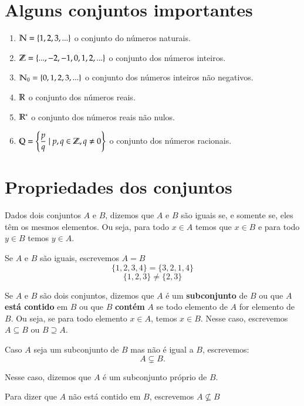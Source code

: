 \section{Alguns conjuntos importantes}
\begin{enumerate}
\item $\mathbb{N} = \{1,2,3,...\}$ o conjunto do n{\'u}meros naturais.
\item $\mathbb{Z} = \{...,-2,-1,0,1,2,...\}$ o conjunto dos n{\'u}meros inteiros.
\item $\mathbb{N}_0 = \{0,1,2,3,...\}$ o conjunto dos n{\'u}meros inteiros n{\~a}o negativos.
\item $\mathbb{R} $ o conjunto dos n{\'u}meros reais.
\item $\mathbb{R}^*$ o conjunto dos n{\'u}meros reais n{\~a}o nulos.
\item $\mathbb{Q} = \left\{\dfrac{p}{q} \mid p,q \in \mathbb{Z}, q \neq 0 \right\}$ o conjunto dos n{\'u}meros racionais.
\end{enumerate}

\section{Propriedades dos conjuntos}

\begin{definicao}
	Dados dois conjuntos $A$ e $B$, dizemos que $A$ e $B$ s{\~a}o iguais se, e somente se, eles t{\^e}m os mesmos elementos. Ou seja, para todo $x \in A$ temos que $x \in B$ e para todo $y \in B$ temos $y \in A$.
\end{definicao}

Se $A$ e $B$ s{\~a}o iguais, escrevemos $A = B$
\[ \{1,2,3,4\} = \{3,2,1,4\} \]
\[ \{1,2,3\} \neq \{2,3\} \]

\begin{definicao}
	Se $A$ e $B$ s{\~a}o dois conjuntos, dizemos que $A$ {\'e} um \textbf{subconjunto} de $B$ ou que $A$ \textbf{está contido} em $B$ ou que $B$ \textbf{contém} $A$ se todo elemento de $A$ for elemento de $B$. Ou seja, se para todo elemento $x \in A$, temos $x \in B$. Nesse caso, escrevemos $A \subseteq B$ ou $B \supseteq A$.
\end{definicao}


Caso $A$ seja um subconjunto de $B$ mas n{\~a}o {\'e} igual a $B$, escrevemos:
\[
A \subsetneq B.
\]

Nesse caso, dizemos que $A$ {\'e} um subconjunto pr{\'o}prio de $B$.

Para dizer que $A$ n{\~a}o est{\'a} contido em $B$, escrevemos $A \nsubseteq B$

